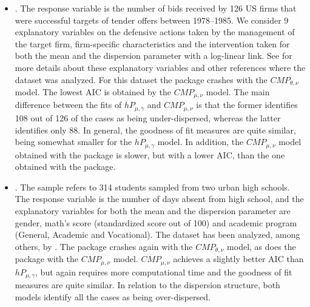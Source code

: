 \begin{itemize}
    \item {}. The response variable is the number of bids received by 126 US firms that were successful targets of tender offers between 1978–1985. We consider 9 explanatory variables on the defensive actions taken by the management of the target firm, firm-specific characteristics and the intervention taken for both the mean and the dispersion parameter with a log-linear link. See \citet{hp} for more details about these explanatory variables and other references where the dataset was analyzed. For this dataset the  package crashes with the $CMP_{\theta, \nu}$ model. The lowest AIC is obtained by the $CMP_{\mu, \nu}$ model. The main difference between the fits of $hP_{\mu, \gamma}$ and $CMP_{\mu, \nu}$ is that the former identifies 108 out of 126 of the cases as being under-dispersed, whereas the latter identifies only 88. In general, the goodness of fit measures are quite similar, being somewhat smaller for the $hP_{\mu, \gamma}$ model. In addition, the  $CMP_{\mu, \nu}$ model obtained with the  package is slower, but with a lower AIC, than the one obtained with the  package.

    \item {}. The sample refers to 314 students sampled from two urban high schools. The response variable is the number of days absent from high school, and the explanatory variables for both the mean and the dispersion parameter are gender, math's score (standardized score out of 100) and academic program (General, Academic and Vocational). The dataset has been analyzed, among others, by \citet{huang}. The  package crashes again with the $CMP_{\theta, \nu}$ model, as does the  package with the $CMP_{\mu, \nu}$ model. $CMP_{\mu, \nu}$ achieves a slightly better AIC than $hP_{\mu, \gamma}$, but again requires more computational time and the goodness of fit measures are quite similar. In relation to the dispersion structure, both models identify all the cases as being over-dispersed.


\end{itemize}
